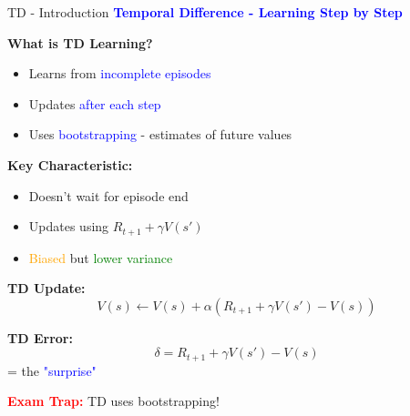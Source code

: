 \documentclass[8pt]{beamer}
\begin{document}
	\begin{frame}{TD - Introduction}
		\fontsize{6.5}{7.5}\selectfont
		\textcolor{blue}{\textbf{Temporal Difference - Learning Step by Step}}
		
		\textbf{What is TD Learning?}
		\begin{itemize}
			\item Learns from \textcolor{blue}{incomplete episodes}
			\item Updates \textcolor{blue}{after each step}
			\item Uses \textcolor{blue}{bootstrapping} - estimates of future values
		\end{itemize}
		
		\textbf{Key Characteristic:}
		\begin{itemize}
			\item Doesn't wait for episode end
			\item Updates using $R_{t+1} + \gamma V(s')$
			\item \textcolor{orange}{Biased} but \textcolor{green}{lower variance}
		\end{itemize}
		
		\textbf{TD Update:}
		\[
		V(s) \leftarrow V(s) + \alpha(R_{t+1} + \gamma V(s') - V(s))
		\]
		
		\textbf{TD Error:}
		\[
		\delta = R_{t+1} + \gamma V(s') - V(s)
		\]
		= the \textcolor{blue}{"surprise"}
		
		\textcolor{red}{\textbf{Exam Trap:}} TD uses bootstrapping!
	\end{frame}
	
\end{document}
